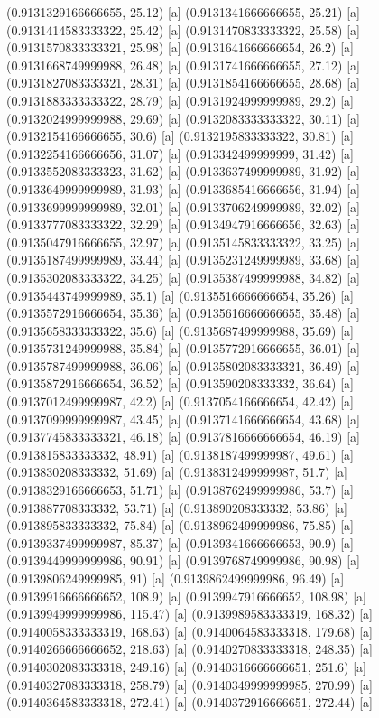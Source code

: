 {{{(0.9131329166666655, 25.12) [a] 
(0.9131341666666655, 25.21) [a] 
(0.9131414583333322, 25.42) [a] 
(0.9131470833333322, 25.58) [a] 
(0.9131570833333321, 25.98) [a] 
(0.9131641666666654, 26.2) [a] 
(0.9131668749999988, 26.48) [a] 
(0.9131741666666655, 27.12) [a] 
(0.9131827083333321, 28.31) [a] 
(0.9131854166666655, 28.68) [a] 
(0.9131883333333322, 28.79) [a] 
(0.9131924999999989, 29.2) [a] 
(0.9132024999999988, 29.69) [a] 
(0.9132083333333322, 30.11) [a] 
(0.9132154166666655, 30.6) [a] 
(0.9132195833333322, 30.81) [a] 
(0.9132254166666656, 31.07) [a] 
(0.913342499999999, 31.42) [a] 
(0.9133552083333323, 31.62) [a] 
(0.9133637499999989, 31.92) [a] 
(0.9133649999999989, 31.93) [a] 
(0.9133685416666656, 31.94) [a] 
(0.9133699999999989, 32.01) [a] 
(0.9133706249999989, 32.02) [a] 
(0.9133777083333322, 32.29) [a] 
(0.9134947916666656, 32.63) [a] 
(0.9135047916666655, 32.97) [a] 
(0.9135145833333322, 33.25) [a] 
(0.9135187499999989, 33.44) [a] 
(0.9135231249999989, 33.68) [a] 
(0.9135302083333322, 34.25) [a] 
(0.9135387499999988, 34.82) [a] 
(0.9135443749999989, 35.1) [a] 
(0.9135516666666654, 35.26) [a] 
(0.9135572916666654, 35.36) [a] 
(0.9135616666666655, 35.48) [a] 
(0.9135658333333322, 35.6) [a] 
(0.9135687499999988, 35.69) [a] 
(0.9135731249999988, 35.84) [a] 
(0.9135772916666655, 36.01) [a] 
(0.9135787499999988, 36.06) [a] 
(0.9135802083333321, 36.49) [a] 
(0.9135872916666654, 36.52) [a] 
(0.913590208333332, 36.64) [a] 
(0.9137012499999987, 42.2) [a] 
(0.9137054166666654, 42.42) [a] 
(0.9137099999999987, 43.45) [a] 
(0.9137141666666654, 43.68) [a] 
(0.9137745833333321, 46.18) [a] 
(0.9137816666666654, 46.19) [a] 
(0.913815833333332, 48.91) [a] 
(0.9138187499999987, 49.61) [a] 
(0.913830208333332, 51.69) [a] 
(0.9138312499999987, 51.7) [a] 
(0.9138329166666653, 51.71) [a] 
(0.9138762499999986, 53.7) [a] 
(0.913887708333332, 53.71) [a] 
(0.913890208333332, 53.86) [a] 
(0.913895833333332, 75.84) [a] 
(0.9138962499999986, 75.85) [a] 
(0.9139337499999987, 85.37) [a] 
(0.9139341666666653, 90.9) [a] 
(0.9139449999999986, 90.91) [a] 
(0.9139768749999986, 90.98) [a] 
(0.9139806249999985, 91) [a] 
(0.9139862499999986, 96.49) [a] 
(0.9139916666666652, 108.9) [a] 
(0.9139947916666652, 108.98) [a] 
(0.9139949999999986, 115.47) [a] 
(0.9139989583333319, 168.32) [a] 
(0.9140058333333319, 168.63) [a] 
(0.9140064583333318, 179.68) [a] 
(0.9140266666666652, 218.63) [a] 
(0.9140270833333318, 248.35) [a] 
(0.9140302083333318, 249.16) [a] 
(0.9140316666666651, 251.6) [a] 
(0.9140327083333318, 258.79) [a] 
(0.9140349999999985, 270.99) [a] 
(0.9140364583333318, 272.41) [a] 
(0.9140372916666651, 272.44) [a] 
}}}
